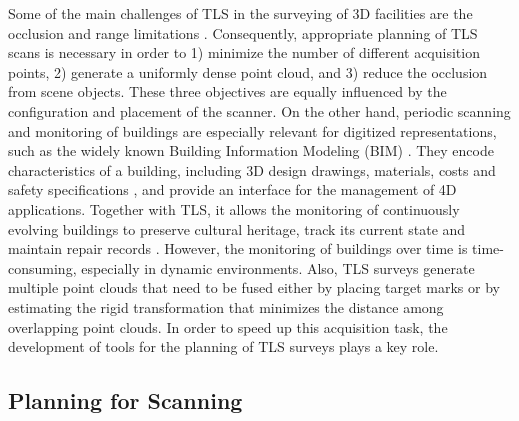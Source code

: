 Some of the main challenges of TLS in the surveying of 3D facilities are the occlusion and range limitations \cite{soudarissanane_optimizing_2012}. Consequently, appropriate planning of TLS scans is necessary in order to 1) minimize the number of different acquisition points, 2) generate a uniformly dense point cloud, and 3) reduce the occlusion from scene objects. These three objectives are equally influenced by the configuration and placement of the scanner. On the other hand, periodic scanning and monitoring of buildings are especially relevant for digitized representations, such as the widely known Building Information Modeling (BIM) \cite{macher_point_2017}. They encode characteristics of a building, including 3D design drawings, materials, costs and safety specifications \cite{patraucean_state_2015}, and provide an interface for the management of 4D applications. Together with TLS, it allows the monitoring of continuously evolving buildings to preserve cultural heritage, track its current state and maintain repair records \cite{rocha_scan--bim_2020, andriasyan_point_2020, moyano_bringing_2020, ham_phased_2020}. However, the monitoring of buildings over time is time-consuming, especially in dynamic environments. Also, TLS surveys generate multiple point clouds that need to be fused either by placing target marks \cite{gollob_comparison_2020} or by estimating the rigid transformation that minimizes the distance among overlapping point clouds. In order to speed up this acquisition task, the development of tools for the planning of TLS surveys plays a key role.

\subsection{Planning for Scanning}

